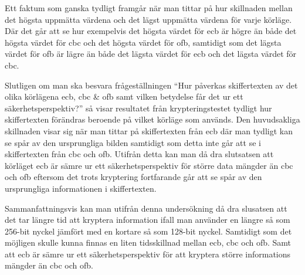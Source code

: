 Ett faktum som ganska tydligt framgår när man tittar på hur skillnaden mellan det högsta uppmätta värdena och det lägst uppmätta värdena för varje körläge. Där det går att se hur
exempelvis det högsta värdet för \acrshort{ecb} är högre än både det högsta värdet för \acrshort{cbc} och det högsta värdet för \acrshort{ofb}, samtidigt som det lägsta värdet för
\acrshort{ofb} är lägre än både det lägsta värdet för \acrshort{ecb} och det lägsta värdet för \acrshort{cbc}.

Slutligen om man ska besvara frågeställningen “Hur påverkas skiffertexten av det olika körlägena \acrshort{ecb}, \acrshort{cbc} \& \acrshort{ofb} samt vilken betydelse får det ur ett säkerhetsperspektiv?”
så visar resultatet från krypteringstestet tydligt hur skiffertexten förändras beroende på vilket körläge som används. Den huvudsakliga skillnaden visar sig när man tittar på skiffertexten
från \acrshort{ecb} där man tydligt kan se spår av den ursprungliga bilden samtidigt som detta inte går att se i skiffertexten från \acrshort{cbc} och \acrshort{ofb}. Utifrån detta kan man då dra slutsatsen
att körläget \acrshort{ecb} är sämre ur ett säkerhetsperspektiv för större data mängder än \acrshort{cbc} och \acrshort{ofb} eftersom det trots kryptering fortfarande går att se spår av den ursprungliga
informationen i skiffertexten.

Sammanfattningsvis kan man utifrån denna undersökning då dra slusatsen att det tar längre tid att kryptera information ifall man använder en längre så som 256-bit nyckel jämfört med en kortare så som 128-bit nyckel. Samtidigt
som det möjligen skulle kunna finnas en liten tidsskillnad mellan \acrshort{ecb}, \acrshort{cbc} och \acrshort{ofb}. Samt att \acrshort{ecb} är sämre ur ett säkerhetsperspektiv för att kryptera större informations mängder än
\acrshort{cbc} och \acrshort{ofb}.
